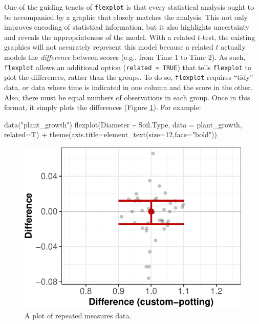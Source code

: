 \documentclass[
  english,
  man]{apa6}
\newenvironment{Shaded}{\begin{snugshade}}{\end{snugshade}}
\newcommand{\AttributeTok}[1]{\textcolor[rgb]{0.77,0.63,0.00}{#1}}
\newcommand{\DecValTok}[1]{\textcolor[rgb]{0.00,0.00,0.81}{#1}}
\newcommand{\FunctionTok}[1]{\textcolor[rgb]{0.00,0.00,0.00}{#1}}
\newcommand{\NormalTok}[1]{#1}
\newcommand{\SpecialCharTok}[1]{\textcolor[rgb]{0.00,0.00,0.00}{#1}}
\newcommand{\StringTok}[1]{\textcolor[rgb]{0.31,0.60,0.02}{#1}}
\begin{document}
One of the guiding tenets of \texttt{flexplot} is that every statistical analysis ought to be accompanied by a graphic that closely matches the analysis. This not only improves encoding of statistical information, but it also highlights uncertainty and reveals the appropriateness of the model. With a related \(t\)-test, the existing graphics will not accurately represent this model because a related \(t\) actually models the \emph{difference} between scores (e.g., from Time 1 to Time 2). As such, \texttt{flexplot} allows an additional option (\texttt{related\ =\ TRUE}) that tells \texttt{flexplot} to plot the differences, rather than the groups. To do so, \texttt{flexplot} requires ``tidy'' data, or data where time is indicated in one column and the score in the other. Also, there must be equal numbers of observations in each group. Once in this format, it simply plots the differences (Figure \ref{fig:plant}). For example:

\small

\begin{Shaded}
\begin{Highlighting}[]
\FunctionTok{data}\NormalTok{(}\StringTok{"plant\_growth"}\NormalTok{)}
\FunctionTok{flexplot}\NormalTok{(Diameter }\SpecialCharTok{\textasciitilde{}}\NormalTok{ Soil.Type, }\AttributeTok{data =}\NormalTok{ plant\_growth, }\AttributeTok{related=}\NormalTok{T) }\SpecialCharTok{+}
  \FunctionTok{theme}\NormalTok{(}\AttributeTok{axis.title=}\FunctionTok{element\_text}\NormalTok{(}\AttributeTok{size=}\DecValTok{12}\NormalTok{,}\AttributeTok{face=}\StringTok{"bold"}\NormalTok{))}
\end{Highlighting}
\end{Shaded}

\begin{figure}
\centering
\includegraphics{flexplot_psychmeth_files/figure-latex/plant-1.pdf}
\caption{\label{fig:plant}A plot of repeated measures data.\label{fig:plant}}
\end{figure}
\end{document}
